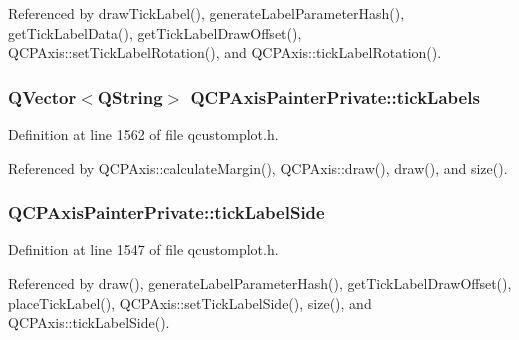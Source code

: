 Referenced by draw\+Tick\+Label(), generate\+Label\+Parameter\+Hash(), get\+Tick\+Label\+Data(), get\+Tick\+Label\+Draw\+Offset(), Q\+C\+P\+Axis\+::set\+Tick\+Label\+Rotation(), and Q\+C\+P\+Axis\+::tick\+Label\+Rotation().

\hypertarget{class_q_c_p_axis_painter_private_ad0a4998ca358ba751e84fca45a025abd}{}
\subsubsection[{tick\+Labels}]{\setlength{\rightskip}{0pt plus 5cm}Q\+Vector$<$Q\+String$>$ Q\+C\+P\+Axis\+Painter\+Private\+::tick\+Labels}\label{class_q_c_p_axis_painter_private_ad0a4998ca358ba751e84fca45a025abd}


Definition at line 1562 of file qcustomplot.\+h.



Referenced by Q\+C\+P\+Axis\+::calculate\+Margin(), Q\+C\+P\+Axis\+::draw(), draw(), and size().

\hypertarget{class_q_c_p_axis_painter_private_a9d27f7625fcfbeb3a60193d0c18fc7e9}{}
\subsubsection[{tick\+Label\+Side}]{ Q\+C\+P\+Axis\+Painter\+Private\+::tick\+Label\+Side}\label{class_q_c_p_axis_painter_private_a9d27f7625fcfbeb3a60193d0c18fc7e9}


Definition at line 1547 of file qcustomplot.\+h.



Referenced by draw(), generate\+Label\+Parameter\+Hash(), get\+Tick\+Label\+Draw\+Offset(), place\+Tick\+Label(), Q\+C\+P\+Axis\+::set\+Tick\+Label\+Side(), size(), and Q\+C\+P\+Axis\+::tick\+Label\+Side().

\hypertarget{class_q_c_p_axis_painter_private_ae7360ff805fc6097019de8b35ffbd7e7}{}

